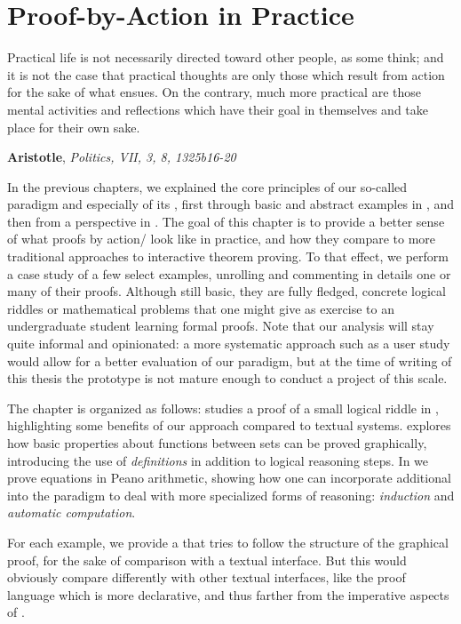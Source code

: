\setchapterpreamble[u]{\margintoc}
\chapter{Proof-by-Action in Practice}

\epigraph{Practical life is not necessarily directed toward other people, as
some think; and it is not the case that practical thoughts are only those which
result from action for the sake of what ensues. On the contrary, much more
practical are those mental activities and reflections which have their goal in
themselves and take place for their own sake.}{\textbf{Aristotle},
\textit{Politics, VII, 3, 8, 1325b16-20}}

In the previous chapters, we explained the core principles of our so-called
 paradigm and especially of its  , first
through basic and abstract examples in , and then from a
 perspective in . The goal of this chapter is
to provide a better sense of what proofs by action/ look like in
practice, and how they compare to more traditional approaches to interactive
theorem proving. To that effect, we perform a case study of a few select
examples, unrolling and commenting in details one or many of their proofs.
Although still basic, they are fully fledged, concrete logical riddles or
mathematical problems that one might give as exercise to an undergraduate
student learning formal proofs. Note that our analysis will stay quite informal
and opinionated: a more systematic approach such as a user study would allow for
a better evaluation of our paradigm, but at the time of writing of this thesis
the  prototype is not mature enough to conduct a project of this
scale.

The chapter is organized as follows:  studies a proof of a small
logical riddle in , highlighting some benefits of our approach
compared to textual systems.  explores how basic properties about
functions between sets can be proved graphically, introducing the use of
\emph{definitions} in addition to logical reasoning steps. In  we
prove equations in Peano arithmetic, showing how one can incorporate additional
 into the paradigm to deal with more specialized forms of reasoning:
\emph{induction} and \emph{automatic computation}.

\begin{kaonote}
  For each example, we provide a   that tries to follow
  the structure of the graphical proof, for the sake of comparison with a
  textual interface. But this would obviously compare differently with other
  textual interfaces, like the  proof language which is more
  declarative, and thus farther from the imperative aspects of .
\end{kaonote}
  
